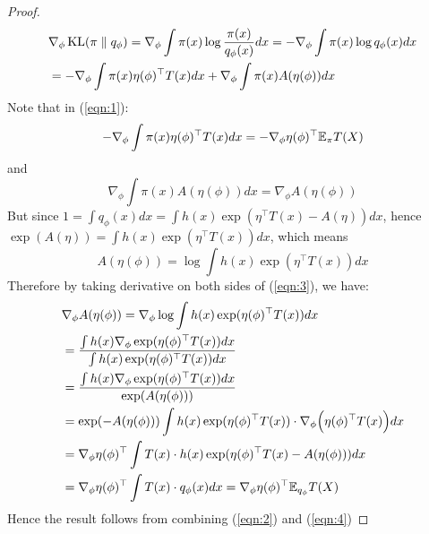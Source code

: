 \documentclass{article}
\DeclareMathOperator{\KL}{\text{KL}}
\begin{document}



\begin{proof}
\begin{align}
& \nabla_{\phi}\KL(\pi \parallel q_{\phi}) = \nabla_{\phi} \int\pi(x) \log \frac{\pi(x)}{q_{\phi}(x)} dx = -\nabla_{\phi} \int \pi(x) \log q_{\phi}(x) dx \notag \\
& = -\nabla_{\phi}\int \pi(x) \eta(\phi)^{\top} T(x) dx + \nabla_{\phi}\int \pi(x) A(\eta(\phi)) dx \label{eqn:1}
\end{align}
Note that in (\ref{eqn:1}):
\begin{equation}
-\nabla_{\phi}\int \pi(x) \eta(\phi)^{\top} T(x) dx = -\nabla_{\phi} \eta(\phi)^{\top} \mathbb{E}_{\pi} T(X) \label{eqn:2}
\end{equation}
and
\[\nabla_{\phi}\int \pi(x) A(\eta(\phi)) dx = \nabla_{\phi} A(\eta(\phi))\]
But since $1 = \int q_{\phi}(x) dx = \int h(x) \exp(\eta^{\top} T(x) - A(\eta)) dx$, hence $\exp(A(\eta)) = \int h(x) \exp(\eta^{\top} T(x)) dx$, which means \begin{equation}
A(\eta(\phi)) = \log \int h(x) \exp(\eta^{\top} T(x)) dx \label{eqn:3}
\end{equation}
Therefore by taking derivative on both sides of (\ref{eqn:3}), we have:
\begin{align}
& \nabla_{\phi} A(\eta(\phi)) = \nabla_{\phi} \log \int h(x) \exp(\eta(\phi)^{\top} T(x)) dx \notag \\
& = \frac{\int h(x) \nabla_{\phi} \exp(\eta(\phi)^{\top} T(x)) dx}{\int h(x) \exp(\eta(\phi)^{\top} T(x)) dx} \notag\\
& = \frac{\int h(x) \nabla_{\phi} \exp(\eta(\phi)^{\top} T(x)) dx}{\exp(A(\eta(\phi)))} \notag \\
& = \exp(-A(\eta(\phi))) \int h(x)\exp(\eta(\phi)^{\top} T(x))  \cdot \nabla_{\phi} \Big(\eta(\phi)^{\top} T(x)\Big) dx \notag\\
& = \nabla_{\phi} \eta(\phi)^{\top} \int T(x) \cdot h(x)\exp(\eta(\phi)^{\top} T(x) - A(\eta(\phi))) dx \notag\\
& = \nabla_{\phi} \eta(\phi)^{\top} \int T(x) \cdot q_{\phi}(x) dx = \nabla_{\phi} \eta(\phi)^{\top} \mathbb{E}_{q_{\phi}} T(X) \label{eqn:4}
\end{align}
Hence the result follows from combining (\ref{eqn:2}) and (\ref{eqn:4})
\end{proof}
 
\end{document}
